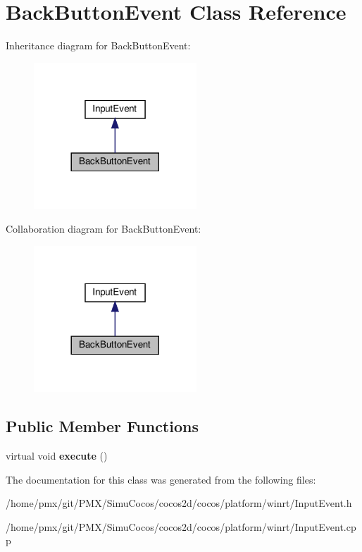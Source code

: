 \hypertarget{classBackButtonEvent}{}\section{Back\+Button\+Event Class Reference}
\label{classBackButtonEvent}


Inheritance diagram for Back\+Button\+Event\+:
\nopagebreak
\begin{figure}[H]
\begin{center}
\leavevmode
\includegraphics[width=173pt]{classBackButtonEvent__inherit__graph}
\end{center}
\end{figure}


Collaboration diagram for Back\+Button\+Event\+:
\nopagebreak
\begin{figure}[H]
\begin{center}
\leavevmode
\includegraphics[width=173pt]{classBackButtonEvent__coll__graph}
\end{center}
\end{figure}
\subsection*{Public Member Functions}
\begin{DoxyCompactItemize}
\item 
\mbox{\label{classBackButtonEvent_adca1f3d0debe78c3810309432950ce7e}} 
virtual void {\bfseries execute} ()
\end{DoxyCompactItemize}


The documentation for this class was generated from the following files\+:\begin{DoxyCompactItemize}
\item 
/home/pmx/git/\+P\+M\+X/\+Simu\+Cocos/cocos2d/cocos/platform/winrt/Input\+Event.\+h\item 
/home/pmx/git/\+P\+M\+X/\+Simu\+Cocos/cocos2d/cocos/platform/winrt/Input\+Event.\+cpp\end{DoxyCompactItemize}
